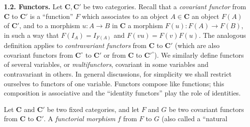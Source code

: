 \noindent\textbf{1.2. Functors.}\quad
{}
Let $\mathbf{C},\mathbf{C}'$ be two categories. Recall that a \textit{covariant functor} from
$\mathbf{C}$ to $\mathbf{C}'$ is a ``function'' $F$ which associates to an object $A\in \mathbf{C}$ an
object $F(A)$ of $\mathbf{C}'$, and to a morphism $u:A\to B$ in $\mathbf{C}$ a
morphism $F(u):F(A)\to F(B)$, in such a way that
$F(I_A)=I_{F(A)}$ and $F(vu)=F(v)F(u)$. The analogous definition applies to
\textit{contravariant functors} from $\mathbf{C}$ to $\mathbf{C}'$ (which are also covariant
functors from $\mathbf{C}^{\circ}$ to $\mathbf{C}'$ or from $\mathbf{C}$ to ${\mathbf{C}'}^{\circ}$). We similarly
define functors of several variables, or \textit{multifunctors}, covariant in
some variables and contravariant in others. In general discussions, for
simplicity we shall restrict ourselves to functors of one variable. Functors
compose like functions; this composition is associative and the ``identity
functors'' play the role of identities.

Let $\mathbf{C}$ and $\mathbf{C}'$ be two fixed categories, and let $F$ and $G$ be two covariant
functors from $\mathbf{C}$ to $\mathbf{C}'$. A \textit{functorial morphism} $f$ from $F$ to $G$
(also called a ``natural

